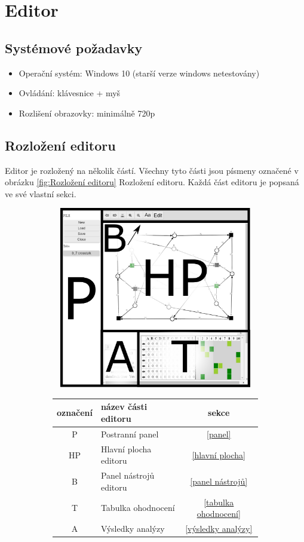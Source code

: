 \documentclass[
  biblatex,
  glossaries,
]{kidiplom}
\begin{document}
\clearpage
\section{Editor}
\subsection{Systémové požadavky}
\begin{itemize}
  \item Operační systém: Windows 10 (starší verze windows netestovány)
  \item Ovládání: klávesnice + myš
  \item Rozlišení obrazovky: minimálně 720p
\end{itemize}

  
\subsection{Rozložení editoru}
Editor je rozložený na několik částí. Všechny tyto části 
jsou písmeny označené v
obrázku \ref{fig:Rozložení editoru} 
Rozložení editoru. Každá část editoru je popsaná ve své vlastní sekci.

\begin{figure}[h]
  \centering
  \begin{subfigure}[h]{350px}
    \includegraphics[height=300px, width=350px]{full_image_splited}
  \end{subfigure}
  \caption{Rozložení editoru}
  \label{fig:Rozložení editoru}
  \begin{subfigure}[h]{0.55\textwidth}
    \begin{tabular}{|c l c|}
      \hline
      označení &      název části editoru &    sekce \\
      \hline
      \hline
      P &             Postranní panel&  \ref{panel} \\
      HP &            Hlavní plocha editoru&  \ref{hlavní plocha} \\
      B &             Panel nástrojů editoru &  \ref{panel nástrojů} \\
      T &             Tabulka ohodnocení &  \ref{tabulka ohodnocení} \\
      A &             Výsledky analýzy &  \ref{výsledky analýzy} \\
      \hline
    \end{tabular}
  \end{subfigure}
\end{figure}
\end{document}
